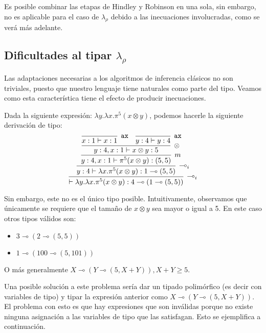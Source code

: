 \begin{observacion}
Es posible combinar las etapas de Hindley y Robinson en una sola, sin embargo, no es aplicable para el caso de $\lambda_\rho$ debido a las inecuaciones involucradas, como se verá más adelante.
\end{observacion}

\subsection{\texorpdfstring{Dificultades al tipar $\lambda_\rho$}{Dificultades al tipar Lambda Rho}}

Las adaptaciones necesarias a los algoritmos de inferencia clásicos no son triviales, puesto que nuestro lenguaje tiene naturales como parte del tipo. Veamos como esta característica tiene el efecto de producir inecuaciones.
\begin{ejemplo}\label{ej:lamrho_tip}
    Dada la siguiente expresión: $\lambda y.\lambda x.\pi^5(x \otimes y)$, podemos hacerle la siguiente derivación de tipo:
\begin{equation*}
\infer[\multimap_i]
{\vdash\lambda y.\lambda x.\pi^5(x\otimes y) : 4 \multimap (1 \multimap (5, 5))}
{\infer[\multimap_i]
    {y: 4 \vdash \lambda x.\pi^5(x\otimes y) : 1 \multimap (5, 5)}
    {\infer[m]
        {y: 4, x:1 \vdash \pi^5(x\otimes y) : (5, 5)}
        {\infer[\otimes]
            {y: 4, x:1 \vdash x\otimes y : 5}
            {\infer[\mathtt{ax}]{x:1 \vdash x : 1}{} \quad \infer[\mathtt{ax}]{y:4 \vdash y :4}{}}
    }}}
\end{equation*}

    Sin embargo, este no es el único tipo posible. Intuitivamente, observamos que únicamente se requiere que el tamaño de $x \otimes y$ sea mayor o igual a 5. En este caso otros tipos válidos son:
    \begin{itemize}
        \item $3 \multimap (2 \multimap (5, 5))$
        \item $1 \multimap (100 \multimap (5, 101))$
    \end{itemize}
    O más generalmente $X \multimap (Y\multimap (5, X+Y)), X+Y\geq 5$.
\end{ejemplo}

Una posible solución a este problema sería  dar un tipado polimórfico (es decir con variables de tipo) y tipar la expresión anterior como $X \multimap (Y \multimap (5, X+Y))$. El problema con esto es que hay expresiones que son inválidas porque no existe ninguna asignación a las variables de tipo que las satisfagan. Esto se ejemplifica a continuación.


